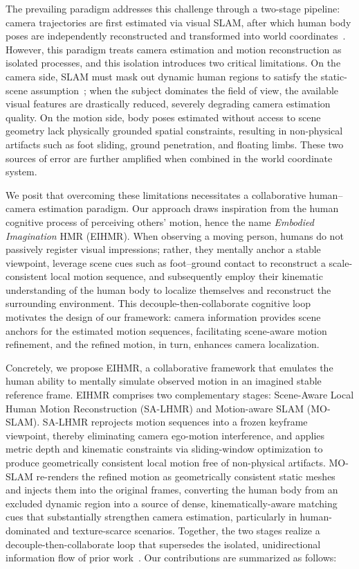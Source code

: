 The prevailing paradigm addresses this challenge through a two-stage pipeline: camera trajectories are first estimated via visual SLAM, after which human body poses are independently reconstructed and transformed into world coordinates~\cite{TRAM2024,SLAHMR2023,PACE2024}. However, this paradigm treats camera estimation and motion reconstruction as isolated processes, and this isolation introduces two critical limitations. On the camera side, SLAM must mask out dynamic human regions to satisfy the static-scene assumption~\cite{DynaSLAM2018}; when the subject dominates the field of view, the available visual features are drastically reduced, severely degrading camera estimation quality. On the motion side, body poses estimated without access to scene geometry lack physically grounded spatial constraints, resulting in non-physical artifacts such as foot sliding, ground penetration, and floating limbs. These two sources of error are further amplified when combined in the world coordinate system.

We posit that overcoming these limitations necessitates a collaborative human--camera estimation paradigm. Our approach draws inspiration from the human cognitive process of perceiving others' motion, hence the name \emph{Embodied Imagination} HMR (EIHMR). When observing a moving person, humans do not passively register visual impressions; rather, they mentally anchor a stable viewpoint, leverage scene cues such as foot--ground contact to reconstruct a scale-consistent local motion sequence, and subsequently employ their kinematic understanding of the human body to localize themselves and reconstruct the surrounding environment. This decouple-then-collaborate cognitive loop motivates the design of our framework: camera information provides scene anchors for the estimated motion sequences, facilitating scene-aware motion refinement, and the refined motion, in turn, enhances camera localization.

Concretely, we propose EIHMR, a collaborative framework that emulates the human ability to mentally simulate observed motion in an imagined stable reference frame. EIHMR comprises two complementary stages: Scene-Aware Local Human Motion Reconstruction (SA-LHMR) and Motion-aware SLAM (MO-SLAM). SA-LHMR reprojects motion sequences into a frozen keyframe viewpoint, thereby eliminating camera ego-motion interference, and applies metric depth and kinematic constraints via sliding-window optimization to produce geometrically consistent local motion free of non-physical artifacts. MO-SLAM re-renders the refined motion as geometrically consistent static meshes and injects them into the original frames, converting the human body from an excluded dynamic region into a source of dense, kinematically-aware matching cues that substantially strengthen camera estimation, particularly in human-dominated and texture-scarce scenarios. Together, the two stages realize a decouple-then-collaborate loop that supersedes the isolated, unidirectional information flow of prior work~\cite{WHAM2024,TRACE2023,GLAMR2022,GVHMR2024}. Our contributions are summarized as follows:

